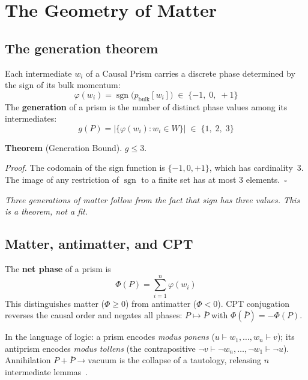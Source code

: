 \documentclass[aps,prd,twocolumn,superscriptaddress,nofootinbib,amsmath,amssymb,longbibliography]{revtex4-2}
\newcommand{\sgn}{\operatorname{sgn}}
\begin{document}
\section{The Geometry of Matter}\label{sec:matter}

\subsection{The generation theorem}\label{sec:generation_theorem}

Each intermediate $w_i$ of a Causal Prism carries a discrete phase
determined by the sign of its bulk momentum:
\begin{equation}\label{eq:phase}
  \varphi(w_i) = \sgn\!\big(p_{\text{bulk}}[w_i]\big)
  \;\in\; \{-1,\; 0,\; +1\}
\end{equation}
The \textbf{generation} of a prism is the number of distinct phase
values among its intermediates:
\begin{equation}\label{eq:generation}
  g(P) = |\{\varphi(w_i) : w_i \in W\}|
  \;\in\; \{1,\; 2,\; 3\}
\end{equation}

\textbf{Theorem} (Generation Bound).
$g \leq 3$.

\emph{Proof.}
The codomain of the sign function is $\{-1, 0, +1\}$, which has
cardinality~3.  The image of any restriction of $\sgn$ to a finite set
has at most 3 elements.~$\square$

\emph{Three generations of matter follow from the fact that sign has
three values.  This is a theorem, not a fit.}

\subsection{Matter, antimatter, and CPT}\label{sec:cpt}

The \textbf{net phase} of a prism is
\begin{equation}\label{eq:net_phase}
  \Phi(P) = \sum_{i=1}^{n} \varphi(w_i)
\end{equation}
This distinguishes matter ($\Phi \geq 0$) from antimatter ($\Phi < 0$).
CPT conjugation reverses the causal order and negates all phases:
$P \mapsto \bar{P}$ with $\Phi(\bar{P}) = -\Phi(P)$.

In the language of logic: a prism encodes \emph{modus ponens}
($u \vdash w_1, \ldots, w_n \vdash v$); its antiprism encodes
\emph{modus tollens} (the contrapositive
$\neg v \vdash \neg w_n, \ldots, \neg w_1 \vdash \neg u$).
Annihilation $P + \bar{P} \to \text{vacuum}$ is the collapse of a
tautology, releasing $n$ intermediate lemmas~\cite{stone1936}.
\end{document}
